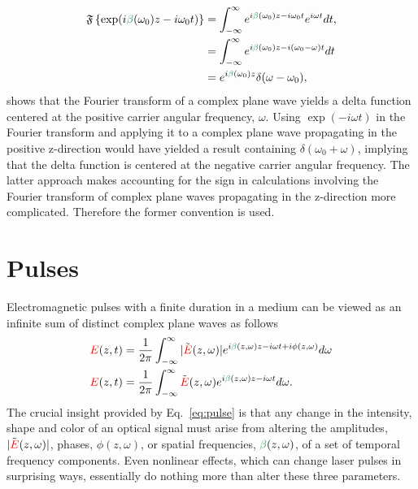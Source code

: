 \begin{align}
    \FT\left\{\exp(i\betag(\omega_0)z-i\omega_0 t)\right\} &= \int_{-\infty}^{\infty} e^{i\betag(\omega_0)z-i\omega_0 t} e^{i\omega t} dt, \\ \nonumber
      &= \int_{-\infty}^{\infty} e^{i\betag(\omega_0)z-i(\omega_0-\omega) t} dt \\ \nonumber
      &= e^{i\betag(\omega_0)z}\delta(\omega-\omega_0),
\end{align} 
shows that the Fourier transform of a complex plane wave yields a delta function centered at the positive carrier angular frequency, $\omega$. Using $\exp(-i\omega t)$ in the Fourier transform and applying it to a complex plane wave propagating in the positive z-direction would have yielded a result containing $\delta(\omega_0+\omega)$, implying that the delta function is centered at the negative carrier angular frequency. The latter approach makes accounting for the sign in calculations involving the Fourier transform of complex plane waves propagating in the z-direction more complicated. Therefore the former convention is used. 

\section{Pulses}
Electromagnetic pulses with a finite duration in a medium can be viewed as an infinite sum of distinct complex plane waves as follows
\begin{align}
    \label{eq:pulse}
    \E(z,t) &= \frac{1}{2\pi}\int_{-\infty}^{\infty} |\Tilde{\E}(z,\omega)| e^{i\betag(z,\omega)z-i\omega t+i\phi(z,\omega)} d\omega \\ \nonumber
    \E(z,t) &= \frac{1}{2\pi}\int_{-\infty}^{\infty} \Tilde{\E}(z,\omega) e^{i\betag(z,\omega)z-i\omega t} d\omega.
\end{align}
The crucial insight provided by Eq.~\ref{eq:pulse} is that any change in the intensity, shape and color of an optical signal must arise from altering the amplitudes, $|\Tilde{\textcolor{red}{E}}(z,\omega)|$, phases, $\phi(z,\omega)$, or spatial frequencies, $\betag(z,\omega)$, of a set of temporal frequency components. Even nonlinear effects, which can change laser pulses in surprising ways, essentially do nothing more than alter these three parameters. 



